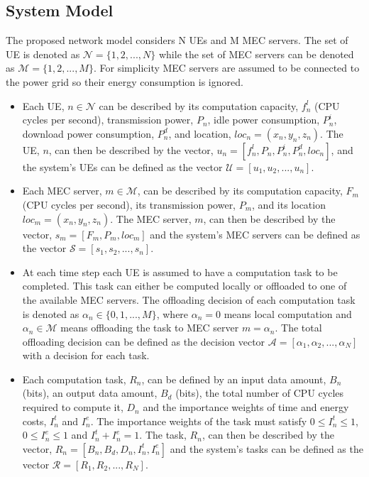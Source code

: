 \subsection{System Model}
\noindent The proposed network model considers N \acrshort{UE}s and M \acrshort{MEC} servers. The set of \acrshort{UE} is denoted as $\mathcal{N} = \{1, 2, ..., N\}$ while the set of \acrshort{MEC} servers can be denoted as $\mathcal{M} = \{1, 2, ..., M\}$. For simplicity \acrshort{MEC} servers are assumed to be connected to the power grid so their energy consumption is ignored.
\begin{itemize}
    \item Each \acrshort{UE}, $n \in \mathcal{N}$ can be described by its computation capacity, $f_n^l$ (\acrshort{CPU} cycles per second), transmission power, $P_n$, idle power consumption, $P^i_n$, download power consumption, $P_n^d$, and location, $loc_n = (x_n, y_n, z_n)$. The UE, $n$, can then be described by the vector, $u_n = [f_n^l, P_n, P_n^i, P_n^d, loc_n]$, and the system's \acrshort{UE}s can be defined as the vector $\mathcal{U} = [u_1, u_2, ..., u_n]$.

    \item Each \acrshort{MEC} server, $m \in \mathcal{M}$, can be described by its computation capacity, $F_m$ (\acrshort{CPU} cycles per second), its transmission power, $P_m$, and its location $loc_m = (x_n, y_n, z_n)$. The \acrshort{MEC} server, $m$, can then be described by the vector, $s_m = [F_m, P_m, loc_m]$ and the system's \acrshort{MEC} servers can be defined as the vector $\mathcal{S} = [s_1, s_2, ..., s_n]$.

    \item At each time step each \acrshort{UE} is assumed to have a computation task to be completed. This task can either be computed locally or offloaded to one of the available \acrshort{MEC} servers. The offloading decision of each computation task is denoted as $\alpha_n \in \{0, 1, ..., M\}$, where $\alpha_n = 0$ means local computation and $\alpha_n \in \mathcal{M}$ means offloading the task to \acrshort{MEC} server $m = \alpha_n$. The total offloading decision can be defined as the decision vector $\mathcal{A} = [\alpha_1, \alpha_2, ..., \alpha_N]$ with a decision for each task.

    \item Each computation task, $R_n$, can be defined by an input data amount, $B_n$ (bits), an output data amount, $B_d$ (bits), the total number of \acrshort{CPU} cycles required to compute it, $D_n$ and the importance weights of time and energy costs, $I_n^t$ and $I_n^e$. The importance weights of the task must satisfy $0 \leq I_n^t \leq 1$, $0 \leq I_n^e \leq 1$ and $I_n^t + I_n^e = 1$. The task, $R_n$, can then be described by the vector, $R_n = [B_n, B_d, D_n, I_n^t, I_n^e]$ and the system's tasks can be defined as the vector $\mathcal{R} = [R_1, R_2, ..., R_N]$.


\end{itemize}

